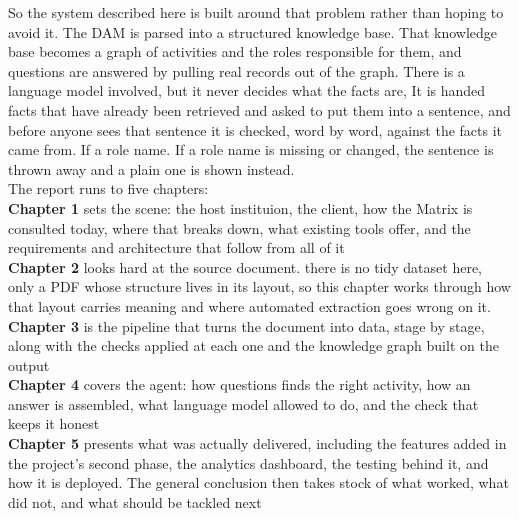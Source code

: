 So the system described here is built around that problem rather than hoping to avoid it. The DAM is parsed into a structured knowledge base. That knowledge base becomes a graph of activities and the roles responsible for them, and questions are answered by pulling real records out of the graph. There is a language model involved, but it never decides what the facts are, It is handed facts that have already been retrieved and asked to put them into a sentence, and before anyone sees that sentence it is checked, word by word, against the facts it came from. If a role name. If a role name is missing or changed, the sentence is thrown away and a plain one is shown instead. \\[0.5cm]
The report runs to five chapters:\\ [0.3cm]
\textbf{Chapter 1} sets the scene: the host instituion, the client, how the Matrix is consulted today, where that breaks down, what existing tools offer, and the requirements and architecture that follow from all of it\\[0.3cm]
\textbf{Chapter 2} looks hard at the source document. there is no tidy dataset here, only a PDF whose structure lives in its layout, so this chapter works through how that layout carries meaning and where automated extraction goes wrong on it. \\[0.3cm]
\textbf{Chapter 3} is the pipeline that turns the document into data, stage by stage, along with the checks applied at each one and the knowledge graph built on the output\\[0.3cm]
\textbf{Chapter 4} covers the agent: how questions finds the right activity, how an answer is assembled, what language model allowed to do, and the check that keeps it honest \\[0.3cm]
\textbf{Chapter 5} presents what was actually delivered, including the features added in the project's second phase, the analytics dashboard, the testing behind it, and how it is deployed. The general conclusion then takes stock of what worked, what did not, and what should be tackled next
